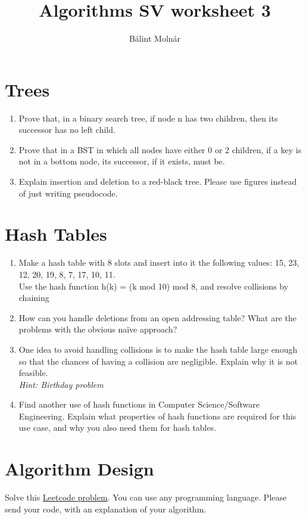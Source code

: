 \documentclass{article}
\title{{Algorithms SV worksheet 3}}
\author{Bálint Molnár}
\begin{document}
\maketitle


\section{Trees}

\begin{enumerate}
   \item Prove that, in a binary search tree, if node n has two children, then
its successor has no left child.
\item Prove that in a BST in which all nodes have either 0 or 2 children, if a key is not in a bottom node, its successor, if it exists, must be.
\item Explain insertion and deletion to a red-black tree. Please use figures instead of just writing pseudocode.

\end{enumerate}

\section{Hash Tables}

\begin{enumerate}
    \item Make a hash table with 8 slots and insert into it the following values:
15, 23, 12, 20, 19, 8, 7, 17, 10, 11.\\
Use the hash function 
h(k) = (k mod 10) mod 8,
and resolve collisions by chaining
\item How can you handle deletions from an open addressing table? What are the
problems with the obvious naïve approach?
\item One idea to avoid handling collisions is to make the hash table large enough so that the chances of having a collision are negligible. Explain why it is not feasible.\\
\emph{Hint: Birthday problem}

\item Find another use of hash functions in Computer Science/Software Engineering. Explain what properties of hash functions are required for this use case, and why you also need them for hash tables.
\end{enumerate}
\section{Algorithm Design}
Solve this \href{https://leetcode.com/problems/lru-cache/description/}{Leetcode problem}. You can use any programming language. Please send your code, with an explanation of your algorithm.\\
\end{document}
